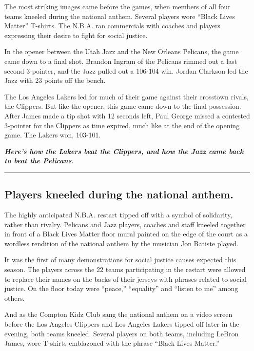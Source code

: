 The most striking images came before the games, when members of all four
teams kneeled during the national anthem. Several players wore ``Black
Lives Matter'' T-shirts. The N.B.A. ran commercials with coaches and
players expressing their desire to fight for social justice.

In the opener between the Utah Jazz and the New Orleans Pelicans, the
game came down to a final shot. Brandon Ingram of the Pelicans rimmed
out a last second 3-pointer, and the Jazz pulled out a 106-104 win.
Jordan Clarkson led the Jazz with 23 points off the bench.

The Los Angeles Lakers led for much of their game against their
crosstown rivals, the Clippers. But like the opener, this game came down
to the final possession. After James made a tip shot with 12 seconds
left, Paul George missed a contested 3-pointer for the Clippers as time
expired, much like at the end of the opening game. The Lakers won,
103-101.

\emph{\textbf{Here's how the Lakers beat the Clippers, and how the Jazz
came back to beat the Pelicans.}}

\begin{center}\rule{0.5\linewidth}{\linethickness}\end{center}

\hypertarget{players-kneeled-during-the-national-anthem}{%
\subsection{Players kneeled during the national
anthem.}\label{players-kneeled-during-the-national-anthem}}

The highly anticipated N.B.A. restart tipped off with a symbol of
solidarity, rather than rivalry. Pelicans and Jazz players, coaches and
staff kneeled together in front of a Black Lives Matter floor mural
painted on the edge of the court as a wordless rendition of the national
anthem by the musician Jon Batiste played.

It was the first of many demonstrations for social justice causes
expected this season. The players across the 22 teams participating in
the restart were allowed to replace their names on the backs of their
jerseys with phrases related to social justice. On the floor today were
``peace,'' ``equality'' and ``listen to me'' among others.

And as the Compton Kidz Club sang the national anthem on a video screen
before the Los Angeles Clippers and Los Angeles Lakers tipped off later
in the evening, both teams kneeled. Several players on both teams,
including LeBron James, wore T-shirts emblazoned with the phrase ``Black
Lives Matter.''

